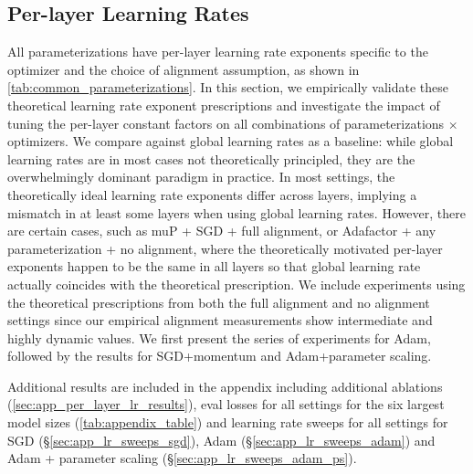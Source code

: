 \documentclass{article}
\newcommand{\sref}[1]{\S\ref{#1}}
\theoremstyle{plain}
\theoremstyle{definition}
\theoremstyle{remark}
\begin{document}
\subsection{Per-layer Learning Rates}
\label{sec:results_per_layer}
All parameterizations have per-layer learning rate exponents specific to the optimizer and the choice of alignment assumption, as shown in \cref{tab:common_parameterizations}. In this section, we empirically validate these theoretical learning rate exponent prescriptions and investigate the impact of tuning the per-layer constant factors on all combinations of parameterizations $\times$ optimizers. We compare against global learning rates as a baseline: while global learning rates are in most cases not theoretically principled, they are the overwhelmingly dominant paradigm in practice. In most settings, the theoretically ideal learning rate exponents differ across layers, implying a mismatch in at least some layers when using global learning rates. However, there are certain cases, such as muP + SGD + full alignment, or Adafactor + any parameterization + no alignment, where the theoretically motivated per-layer exponents happen to be the same in all layers so that global learning rate actually coincides with the theoretical prescription. We include experiments using the theoretical prescriptions from both the full alignment and no alignment settings since our empirical alignment measurements show intermediate and highly dynamic values. We first present the series of experiments for Adam, followed by the results for SGD+momentum and Adam+parameter scaling. 

Additional results are included in the appendix including additional ablations (\cref{sec:app_per_layer_lr_results}), eval losses for all settings for the six largest model sizes (\cref{tab:appendix_table}) and learning rate sweeps for all settings for SGD (\sref{sec:app_lr_sweeps_sgd}), Adam (\sref{sec:app_lr_sweeps_adam}) and Adam + parameter scaling (\sref{sec:app_lr_sweeps_adam_ps}). 
\end{document}
